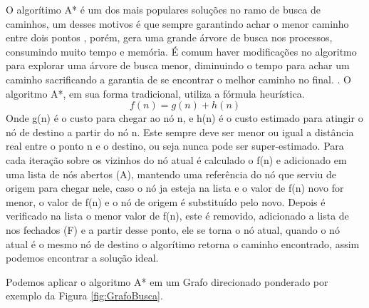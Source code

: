O algorítimo A* é um dos mais populares soluções no ramo de busca de caminhos, um desses motivos é que sempre garantindo achar o menor caminho entre dois pontos \cite{PEHart}, porém,  gera uma grande árvore de busca nos processos, consumindo muito tempo e memória. É comum haver modificações no algoritmo para explorar uma árvore de busca menor, diminuindo o tempo para achar um caminho sacrificando a garantia de se encontrar o melhor caminho no final. \cite{Botea}.
O algoritmo A*, em sua forma tradicional, utiliza a fórmula heurística.
\[f(n) = g(n) + h(n)\]
Onde g(n) é o custo para chegar ao nó n, e h(n) é o custo estimado para atingir o nó de destino a partir do nó n. Este sempre deve ser menor ou igual a distância real entre o ponto n e o destino, ou seja nunca pode ser super-estimado. Para cada iteração sobre os vizinhos do nó atual é calculado o f(n) e adicionado em uma lista de nós abertos (A), mantendo uma referência do nó que serviu de origem para chegar nele, caso o nó ja esteja na lista e o valor de f(n) novo for menor, o valor de f(n) e o nó de origem é substituído pelo novo. Depois é verificado na lista o menor valor de f(n), este é removido, adicionado a lista de nos fechados (F) e a partir desse ponto, ele se torna o nó atual, quando o nó atual é o mesmo nó de destino o algorítimo retorna o caminho encontrado, assim podemos encontrar a solução ideal. \cite{PEHart} 

Podemos aplicar o algoritmo A* em um Grafo direcionado ponderado por exemplo da Figura \ref{fig:GrafoBusca}.

\begin{minipage}{\linewidth}
    \label{fig:GrafoBusca}
\end{minipage}

